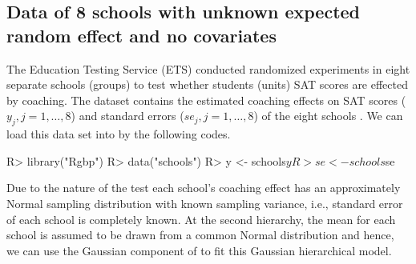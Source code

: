 \documentclass[article]{jss}
\begin{document}



\subsection[Unknown Second-level Mean and No Covariate]{Data of 8 schools with unknown expected random effect and no covariates} \label{sec:ex:8schools}

The Education Testing Service (ETS) conducted randomized experiments in eight separate schools (groups) to test whether students (units) SAT scores are effected by coaching. The dataset contains the estimated coaching effects on SAT scores ($y_{j}, j=1, \ldots, 8$) and standard errors ($se_{j}, j=1, \ldots, 8$) of the eight schools \citep{1981}. We can load this data set into  by the following codes.
\begin{CodeChunk}
\begin{CodeInput}
R> library("Rgbp")
R> data("schools")
R> y  <- schools$y
R> se <- schools$se
\end{CodeInput}
\end{CodeChunk}



Due to the nature of the test each school's coaching effect has an approximately Normal sampling distribution with known sampling variance, i.e., standard error of each school is completely known. At the second hierarchy, the mean for each school is assumed to be drawn from a common Normal distribution and hence, we can use the Gaussian component of  to fit this Gaussian hierarchical model.
\end{document}
